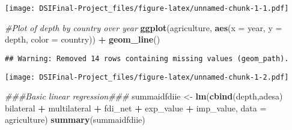 \documentclass[
]{article}
\newenvironment{Shaded}{\begin{snugshade}}{\end{snugshade}}
\newcommand{\CommentTok}[1]{\textcolor[rgb]{0.56,0.35,0.01}{\textit{#1}}}
\newcommand{\DataTypeTok}[1]{\textcolor[rgb]{0.13,0.29,0.53}{#1}}
\newcommand{\KeywordTok}[1]{\textcolor[rgb]{0.13,0.29,0.53}{\textbf{#1}}}
\newcommand{\NormalTok}[1]{#1}
\newcommand{\OperatorTok}[1]{\textcolor[rgb]{0.81,0.36,0.00}{\textbf{#1}}}
\newcommand{\StringTok}[1]{\textcolor[rgb]{0.31,0.60,0.02}{#1}}
\begin{document}
\texttt{[image: DSIFinal-Project\_files/figure-latex/unnamed-chunk-1-1.pdf]}

\begin{Shaded}
\begin{Highlighting}[]
\CommentTok{#Plot of depth by country over year }
\KeywordTok{ggplot}\NormalTok{(agriculture, }\KeywordTok{aes}\NormalTok{(}\DataTypeTok{x =}\NormalTok{ year, }\DataTypeTok{y =}\NormalTok{ depth, }\DataTypeTok{color =}\NormalTok{ country)) }\OperatorTok{+}\StringTok{ }\KeywordTok{geom_line}\NormalTok{()}
\end{Highlighting}
\end{Shaded}

\begin{verbatim}
## Warning: Removed 14 rows containing missing values (geom_path).
\end{verbatim}

\texttt{[image: DSIFinal-Project\_files/figure-latex/unnamed-chunk-1-2.pdf]}

\begin{Shaded}
\begin{Highlighting}[]
\CommentTok{###Basic linear regression###}
\NormalTok{summaidfdiie <-}\StringTok{ }\KeywordTok{lm}\NormalTok{(}\KeywordTok{cbind}\NormalTok{(depth,adesa) }\OperatorTok{~}\StringTok{ }\NormalTok{bilateral }\OperatorTok{+}\StringTok{ }\NormalTok{multilateral }\OperatorTok{+}\StringTok{ }\NormalTok{fdi_net }\OperatorTok{+}\StringTok{ }\NormalTok{exp_value }\OperatorTok{+}\StringTok{ }\NormalTok{imp_value, }\DataTypeTok{data =}\NormalTok{ agriculture)}
\KeywordTok{summary}\NormalTok{(summaidfdiie)}
\end{Highlighting}
\end{Shaded}
\end{document}
